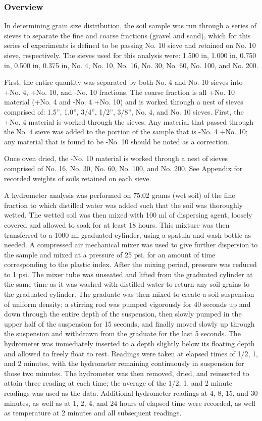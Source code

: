 \documentclass{article}
\begin{document}
\subsubsection{Overview}
\par In determining grain size distribution, the soil sample was run through a series of sieves to separate the fine and coarse fractions (gravel and sand), which for this series of experiments is defined to be passing No. 10 sieve and retained on No. 10 sieve, respectively. The sieves used for this analysis were: 1.500 in, 1.000 in, 0.750 in, 0.500 in, 0.375 in, No. 4, No. 10, No. 16, No. 30, No. 60, No. 100, and No. 200. 
\par First, the entire quantity was separated by both No. 4 and No. 10 sieves into +No. 4, +No. 10, and -No. 10 fractions. The coarse fraction is all +No. 10 material (+No. 4 and -No. 4 +No. 10) and is worked through a nest of sieves comprised of: 1.5”, 1.0”, 3/4”, 1/2”, 3/8”, No. 4, and No. 10 sieves. First, the +No. 4 material is worked through the sieves. Any material that passed through the No. 4 sieve was added to the portion of the sample that is -No. 4 +No. 10; any material that is found to be -No. 10 should be noted as a correction.  
\par Once oven dried, the -No. 10 material is worked through a nest of sieves comprised of No. 16, No. 30, No. 60, No. 100, and No. 200. See Appendix for recorded weights of soils retained on each sieve.  
\par A hydrometer analysis was performed on 75.02 grams (wet soil) of the fine fraction to which distilled water was added such that the soil was thoroughly wetted. The wetted soil was then mixed with 100 ml of dispersing agent, loosely covered and allowed to soak for at least 18 hours. This mixture was then transferred to a 1000 ml graduated cylinder, using a spatula and wash bottle as needed. A compressed air mechanical mixer was used to give further dispersion to the sample and mixed at a pressure of 25 psi. for an amount of time corresponding to the plastic index. After the mixing period, pressure was reduced to 1 psi. The mixer tube was unseated and lifted from the graduated cylinder at the same time as it was washed with distilled water to return any soil grains to the graduated cylinder. The graduate was then mixed to create a soil suspension of uniform density; a stirring rod was pumped vigorously for 40 seconds up and down through the entire depth of the suspension, then slowly pumped in the upper half of the suspension for 15 seconds, and finally moved slowly up through the suspension and withdrawn from the graduate for the last 5 seconds. The hydrometer was immediately inserted to a depth slightly below its floating depth and allowed to freely float to rest. Readings were taken at elapsed times of 1/2, 1, and 2 minutes, with the hydrometer remaining continuously in suspension for those two minutes. The hydrometer was then removed, dried, and reinserted to attain three reading at each time; the average of the 1/2, 1, and 2 minute readings was used as the data. Additional hydrometer readings at 4, 8, 15, and 30 minutes, as well as at 1, 2, 4, and 24 hours of elapsed time were recorded, as well as temperature at 2 minutes and all subsequent readings.  
\end{document}
